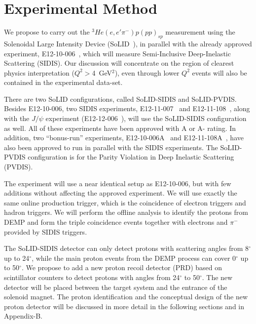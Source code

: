 \section{Experimental Method}
We propose to carry out the $^3He(e,e'\pi^-)p(pp)_{sp}$ measurement using the
Solenoidal Large Intensity Device (SoLID~\cite{solid_pcdr}), in parallel with
the already approved experiment, E12-10-006~\cite{solid:e12-10-006}, which will
measure Semi-Inclusive Deep-Inelastic Scattering (SIDIS). 
Our discussion will concentrate on the region of clearest physics
interpretation ($Q^2>$4~GeV$^2$), even through lower $Q^2$ events will also be
contained in the experimental data-set.

There are two SoLID
configurations, called SoLID-SIDIS and SoLID-PVDIS. Besides E12-10-006, two
SIDIS experiments, E12-11-007~\cite{solid:e12-11-007} and
E12-11-108~\cite{solid:e12-11-108}, along with the $J/\psi$ experiment
(E12-12-006~\cite{solid:e12-12-006}), will use the SoLID-SIDIS
configuration as well. All of these experiments have been approved with A or A-
rating. In addition, two ``bonus-run'' experiments,
E12-10-006A~\cite{solid:e12-10-006A} and E12-11-108A~\cite{solid:e12-11-008A},
have also been approved to run in parallel with the SIDIS experiments. The
SoLID-PVDIS configuration is for the Parity Violation in Deep Inelastic
Scattering (PVDIS).

The experiment will use a near identical setup as E12-10-006, but with few
additions without affecting the approved experiment. We will use exactly the
same online production trigger, which is the coincidence of electron triggers
and hadron triggers. We will perform the offline analysis to identify the
protons from DEMP and form the triple coincidence events together with
electrons and $\pi^{-}$ provided by SIDIS triggers.

The SoLID-SIDIS detector can only detect protons with scattering angles from
8$^{\circ}$ up to 24$^{\circ}$, while the main proton events from the DEMP
process can cover 0$^{\circ}$ up to 50$^{\circ}$. We propose to add a new
proton recoil detector (PRD) based on scintillator counters to detect protons
with angles from 24$^{\circ}$ to 50$^{\circ}$. The new detector will be placed
between the target system and the entrance of the solenoid magnet. The proton
identification and the conceptual design of the new proton detector will be
discussed in more detail in the following sections and in Appendix-B.

